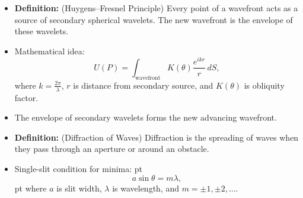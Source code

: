 \documentclass[t,aspectratio=169]{beamer}
\begin{document}
\begin{frame}
\begin{itemize}
\begin{columns}
\begin{column}{0.5\linewidth}
\begin{center}
\end{center}
\end{column}
\end{columns}

\pagebreak
\item \textbf{Definition:} (Huygens--Fresnel Principle) Every point of a wavefront acts as a source of secondary spherical wavelets. The new wavefront is the envelope of these wavelets.
\item Mathematical idea:
$$ U\left(P\right) = \int_{\text{wavefront}} K(\theta)\frac{e^{ikr}}{r} \, dS,$$
where $k =\frac{2\pi}{\lambda}$, $r$ is distance from secondary source, and $K(\theta)$ is obliquity factor.

\item The envelope of secondary wavelets forms the new advancing wavefront.
\begin{center}
\end{center}

\pagebreak
\item \textbf{Definition:} (Diffraction of Waves) Diffraction is the spreading of waves when they pass through an aperture or around an obstacle.
\item Single-slit condition for minima:
 pt
$$ a \sin \theta = m \lambda, $$
 pt
where $a$ is slit width, $\lambda$ is wavelength, and $m = \pm 1, \pm 2, \dots$.


\end{itemize}
\end{frame}
\end{document}
